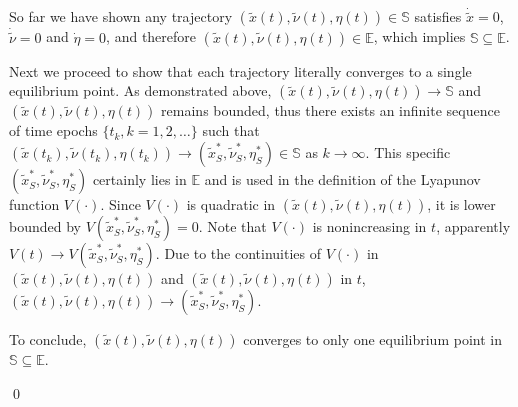 \documentclass[journal,12pt,onecolumn,draftclsnofoot]{IEEEtran}
\begin{document}
	So far we have shown any trajectory $(\tilde{x}(t),\tilde{\nu}(t),\eta(t))\in\mathbb{S}$ satisfies $\dot{\tilde{x}}=0$, $\dot{\tilde{\nu}}=0$ and $\dot \eta=0$, and therefore $(\tilde{x}(t),\tilde{\nu}(t),\eta(t))\in\mathbb{E}$, which implies $\mathbb{S} \subseteq \mathbb{E}$.
	
	Next we proceed to show that each trajectory literally converges to a single equilibrium point. As demonstrated above, $(\tilde{x}(t),\tilde{\nu}(t),\eta(t))\rightarrow \mathbb{S}$ and $(\tilde{x}(t),\tilde{\nu}(t),\eta(t))$ remains bounded, thus there exists an infinite sequence of time epochs $\{t_k,k=1,2,\dots\}$ such that $(\tilde{x}(t_k),\tilde{\nu}(t_k),\eta(t_k)) \rightarrow (\tilde{x}^*_S,\tilde{\nu}^*_S,\eta^*_S) \in \mathbb{S}$ as $k\rightarrow \infty$. This specific $(\tilde{x}^*_S,\tilde{\nu}^*_S,\eta^*_S)$ certainly lies in $\mathbb{E}$ and is used in the definition of the Lyapunov function $V(\cdot)$. Since $V(\cdot)$ is quadratic in $(\tilde{x}(t),\tilde{\nu}(t),\eta(t))$, it is lower bounded by $V(\tilde{x}^*_S,\tilde{\nu}^*_S,\eta^*_S)=0$. Note that $V(\cdot)$ is nonincreasing in $t$, apparently $V(t)\rightarrow V(\tilde{x}^*_S,\tilde{\nu}^*_S,\eta^*_S)$. Due to the continuities of $V(\cdot)$ in $(\tilde{x}(t),\tilde{\nu}(t),\eta(t))$ and $(\tilde{x}(t),\tilde{\nu}(t),\eta(t))$ in $t$, $(\tilde{x}(t),\tilde{\nu}(t),\eta(t)) \rightarrow (\tilde{x}^*_S,\tilde{\nu}^*_S,\eta^*_S)$.
	
	To conclude, $(\tilde{x}(t),\tilde{\nu}(t),\eta(t))$ converges to only one equilibrium point in $\mathbb{S}\subseteq\mathbb{E}$. 






\qed


  
  
\end{document}
